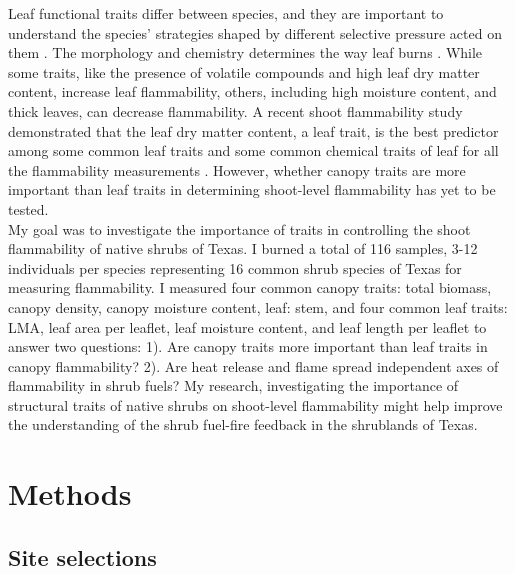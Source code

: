 \documentclass[12pt]{report}
\begin{document}
Leaf functional traits differ between species, and they are important to understand the species' strategies shaped by different selective pressure acted on them \citep{wright2004worldwide}. The morphology and chemistry
determines the way leaf burns \citep{anderson1970forest, owens1998seasonal, schwilk2011scaling, pausas2016secondary, guerrero2021leaf, ganteaume2021volatile,alam2020shoot}. While some traits, like the presence of volatile compounds and high leaf dry matter content, increase leaf flammability, others, including high moisture content, and thick leaves, can decrease flammability. A recent shoot flammability study \citep{alam2020shoot} demonstrated that the leaf dry matter content, a leaf trait, is the best predictor among some common leaf traits and some common chemical traits of leaf  for all the flammability measurements . However, whether canopy traits are more important than leaf traits in determining shoot-level flammability has yet to be tested.\\

My goal was to investigate the importance of traits in controlling the shoot flammability of native shrubs of Texas. I burned a total of 116 samples, 3-12 individuals per species representing 16 common shrub species of Texas for measuring flammability. I measured four common canopy traits: total biomass, canopy density, canopy moisture content, leaf: stem, and four common leaf traits: LMA, leaf area per leaflet, leaf moisture content, and leaf length per leaflet to answer two questions: 1). Are canopy traits more important than leaf traits in canopy flammability? 2). Are heat release and flame spread independent axes of flammability in shrub fuels? My research, investigating the importance of structural traits of native shrubs on shoot-level flammability might help improve the understanding of the shrub fuel-fire feedback in the shrublands of Texas.


\section{Methods}
\subsection{Site selections}
\end{document}
